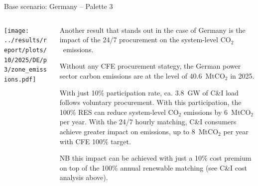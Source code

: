 \begin{frame}{Base scenario: Germany -- Palette 3}

  {\footnotesize
  \vspace{0.1cm}
  
  \begin{columns}[T]
  \begin{column}{9cm}
  \centering
  
  \texttt{[image: ../results/report/plots/10/2025/DE/p3/zone\_emissions.pdf]}
  
  \end{column}
  \begin{column}{6cm}
  
  \vspace{0.1cm}
  Another result that stands out in the case of Germany is the
  impact of the 24/7 procurement on the system-level CO$_2$~emissions. 
  
  \vspace{0.1cm}
  Without any CFE procurement stategy, 
  the German power sector carbon emissions are at the level of 
  40.6~MtCO$_2$ in 2025.
  
  \vspace{0.1cm}
  With just 10\% participation rate, ca. \alert{3.8~GW} of C\&I load 
  follows voluntary procurement. 
  With this participation, the 100\% RES can reduce system-level 
  CO$_2$ emissions by \alert{6~MtCO$_2$} per year.
  With the 24/7 hourly matching, C\&I consumers  
  achieve greater impact on emissions, up to \alert{8~MtCO$_2$} per year
  with CFE 100\% target.

  \vspace{0.1cm}
  NB this impact can be achieved with just a \alert{10\% cost premium}
  on top of the 100\% annual renewable matching (see C\&I cost analysis above).

  \end{column}
  \end{columns}
  }
\end{frame}


